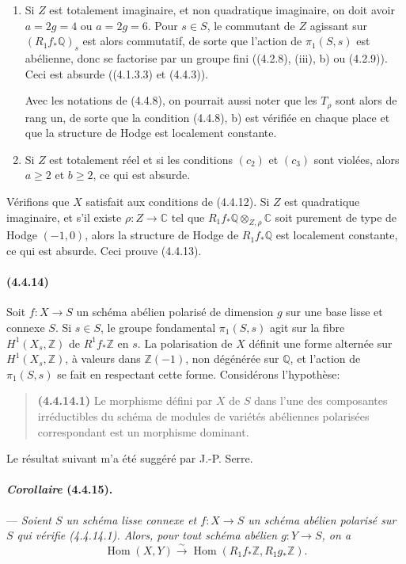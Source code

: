\documentclass[10pt]{article}
\newcommand{\C}{\mathbb C}
\newcommand{\Q}{\mathbb Q}
\newcommand{\Z}{\mathbb Z}
\newcommand{\Hom}{\operatorname{Hom}}
\newcommand{\iso}{\xrightarrow{\sim}}
\begin{document}
\begin{enumerate}[label=\arabic*)]
\item Si $Z$ est totalement imaginaire, et non quadratique imaginaire, on doit avoir $a=2g=4$ ou $a=2g=6$. Pour $s\in S$, le commutant de $Z$ agissant sur $(R_1f_*\Q)_s$ est alors commutatif, de sorte que l'action de $\pi_1(S,s)$ est abélienne, donc se factorise par un groupe fini ((4.2.8), (iii), b) ou (4.2.9)). Ceci est absurde ((4.1.3.3) et (4.4.3)).

Avec les notations de (4.4.8), on pourrait aussi noter que les $T_\rho$ sont alors de rang un, de sorte que la condition (4.4.8), b) est vérifiée en chaque place et que la structure de Hodge est localement constante.

\item Si $Z$ est totalement réel et si les conditions $(c_2)$ et $(c_3)$ sont violées, alors $a\ge2$ et $b\ge2$, ce qui est absurde.
\end{enumerate}

Vérifions que $X$ satisfait aux conditions de (4.4.12). Si $Z$ est quadratique imaginaire, et s'il existe $\rho:Z\to\C$ tel que $R_1f_*\Q\otimes_{Z,\rho}\C$ soit purement de type de Hodge $(-1,0)$, alors la structure de Hodge de $R_1f_*\Q$ est localement constante, ce qui est absurde. Ceci prouve (4.4.13).

\paragraph{(4.4.14)} Soit $f:X\to S$ un schéma abélien polarisé de dimension $g$ sur une base lisse et connexe $S$. Si $s\in S$, le groupe fondamental $\pi_1(S,s)$ agit sur la fibre $H^1(X_s,\Z)$ de $R^1f_*\Z$ en $s$. La polarisation de $X$ définit une forme alternée sur $H^1(X_s,\Z)$, à valeurs dans $\Z(-1)$, non dégénérée sur $\Q$, et l'action de $\pi_1(S,s)$ se fait en respectant cette forme. Considérons l'hypothèse:
\begin{quote}
\noindent\textbf{(4.4.14.1)} Le morphisme défini par $X$ de $S$ dans l'une des composantes irréductibles du schéma de modules de variétés abéliennes polarisées correspondant est un morphisme dominant.
\end{quote}
Le résultat suivant m'a été suggéré par J.-P. Serre.

\paragraph{\emph{Corollaire} (4.4.15).} --- {\itshape Soient $S$ un schéma lisse connexe et $f:X\to S$ un schéma abélien polarisé sur $S$ qui vérifie (4.4.14.1). Alors, pour tout schéma abélien $g:Y\to S$, on a
\[
\Hom(X,Y)\iso\Hom(R_1f_*\Z,R_1g_*\Z).
\]}
\end{document}
